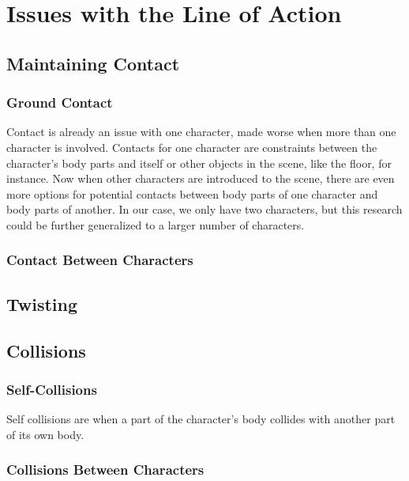 \chapter{Issues with the Line of Action}\label{chap:issues}

\section{Maintaining Contact}
\subsection{Ground Contact}
Contact is already an issue with one character, made worse when more than one character is involved. Contacts for one character are constraints between the character's body parts and itself or other objects in the scene, like the floor, for instance. Now when other characters are introduced to the scene, there are even more options for potential contacts between body parts of one character and body parts of another. In our case, we only have two characters, but this research could be further generalized to a larger number of characters.


\subsection{Contact Between Characters}


\section{Twisting}



\section{Collisions}
\subsection{Self-Collisions}
Self collisions are when a part of the character's body collides with another part of its own body. 

\subsection{Collisions Between Characters}
